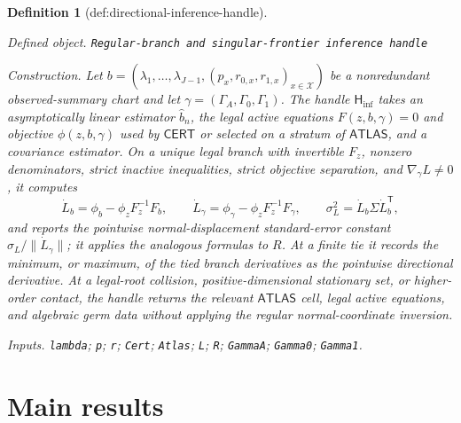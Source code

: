\documentclass{article}
\newtheorem{definition}{Definition}
\begin{document}
\begin{definition}[def:directional-inference-handle]\label{def:directional-inference-handle}
\par\smallskip\noindent\emph{Defined object.} \texttt{Regular-\allowbreak{}branch and singular-\allowbreak{}frontier inference handle}
\par\smallskip\noindent\emph{Construction.} Let \(b=(\lambda_1,\ldots,\lambda_{J-1},(p_x,r_{0,x},r_{1,x})_{x\in\mathcal X})\) be a nonredundant observed-summary chart and let \(\gamma=(\Gamma_A,\Gamma_0,\Gamma_1)\).  The handle \(\mathsf H_{\mathrm{inf}}\) takes an asymptotically linear estimator \(\widehat b_n\), the legal active equations \(F(z,b,\gamma)=0\) and objective \(\phi(z,b,\gamma)\) used by \(\mathsf{CERT}\) or selected on a stratum of \(\mathsf{ATLAS}\), and a covariance estimator.  On a unique legal branch with invertible \(F_z\), nonzero denominators, strict inactive inequalities, strict objective separation, and \(\nabla_\gamma L\neq0\), it computes
\[
\dot L_b=\phi_b-\phi_zF_z^{-1}F_b,
\qquad
\dot L_\gamma=\phi_\gamma-\phi_zF_z^{-1}F_\gamma,
\qquad
\sigma_L^2=\dot L_b\Sigma\dot L_b^{\mathsf T},
\]
and reports the pointwise normal-displacement standard-error constant \(\sigma_L/\|\dot L_\gamma\|\); it applies the analogous formulas to \(R\).  At a finite tie it records the minimum, or maximum, of the tied branch derivatives as the pointwise directional derivative.  At a legal-root collision, positive-dimensional stationary set, or higher-order contact, the handle returns the relevant \(\mathsf{ATLAS}\) cell, legal active equations, and algebraic germ data without applying the regular normal-coordinate inversion.
\par\smallskip\noindent\emph{Inputs.} \texttt{lambda}; \texttt{p}; \texttt{r}; \texttt{Cert}; \texttt{Atlas}; \texttt{L}; \texttt{R}; \texttt{GammaA}; \texttt{Gamma0}; \texttt{Gamma1}.
\end{definition}

\section{Main results}
\end{document}
